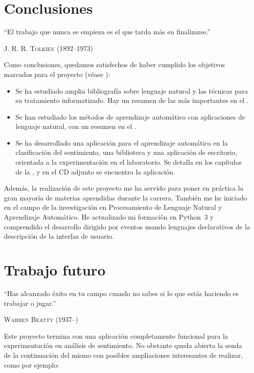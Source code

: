 
\chapter{Conclusiones}

\epigraph{``El trabajo que nunca se empieza es el que tarda más en finalizarse.''}{\textsc{J. R. R. Tolkien} (1892--1973)}

Como conclusiones, quedamos satisfechos de haber cumplido los objetivos marcados para el proyecto (véase ):

\begin{itemize}
\item[\cmark] Se ha estudiado amplia bibliografía sobre lenguaje natural y las técnicas para su tratamiento informatizado. Hay un resumen de las más importantes en el .
\item[\cmark] Se han estudiado los métodos de aprendizaje automático con aplicaciones de lenguaje natural, con un resumen en el .
\item[\cmark] Se ha desarrollado una aplicación para el aprendizaje automático en la clasificación del sentimiento, una biblioteca y una aplicación de escritorio, orientada a la experimentación en el laboratorio. Se detalla en los capítulos de la , y en el CD adjunto se encuentra la aplicación.
\end{itemize}

Además, la realización de este proyecto me ha servido para poner en práctica la gran mayoría de materias aprendidas durante la carrera. También me he iniciado en el campo de la investigación en Procesamiento de Lenguaje Natural y Aprendizaje Automático. He actualizado mi formación en Python~3 y comprendido el desarrollo dirigido por eventos usando lenguajes declarativos de la descripción de la interfaz de usuario.

\chapter{Trabajo futuro}

\epigraph{``Has alcanzado éxito en tu campo cuando no sabes si lo que estás haciendo es trabajar o jugar.''}{\textsc{Warren Beatty} (1937--)}

Este proyecto termina con una aplicación completamente funcional para la experimentación en análisis de sentimiento. No obstante queda abierta la senda de la continuación del mismo con posibles ampliaciones interesantes de realizar, como por ejemplo:

